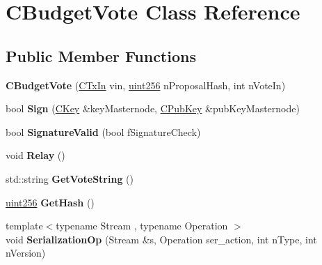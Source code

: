 \hypertarget{class_c_budget_vote}{}\section{C\+Budget\+Vote Class Reference}
\label{class_c_budget_vote}
\subsection*{Public Member Functions}
\begin{DoxyCompactItemize}
\item 
\mbox{\label{class_c_budget_vote_ae6c7bba44af43bbeb1a33f830e0b352e}} 
{\bfseries C\+Budget\+Vote} (\mbox{\hyperlink{class_c_tx_in}{C\+Tx\+In}} vin, \mbox{\hyperlink{classuint256}{uint256}} n\+Proposal\+Hash, int n\+Vote\+In)
\item 
\mbox{\label{class_c_budget_vote_a91e3490282974d9300ba080b4ea41e22}} 
bool {\bfseries Sign} (\mbox{\hyperlink{class_c_key}{C\+Key}} \&key\+Masternode, \mbox{\hyperlink{class_c_pub_key}{C\+Pub\+Key}} \&pub\+Key\+Masternode)
\item 
\mbox{\label{class_c_budget_vote_ab01d2ab30c3761318a7da919bff26697}} 
bool {\bfseries Signature\+Valid} (bool f\+Signature\+Check)
\item 
\mbox{\label{class_c_budget_vote_a2c761ac435fa5a5da6ccbeb308350a8f}} 
void {\bfseries Relay} ()
\item 
\mbox{\label{class_c_budget_vote_a97d8f521e59d47b70203515271ecd2fc}} 
std\+::string {\bfseries Get\+Vote\+String} ()
\item 
\mbox{\label{class_c_budget_vote_acb9bda3b41d3bd1ebf04ccdcb3d2d926}} 
\mbox{\hyperlink{classuint256}{uint256}} {\bfseries Get\+Hash} ()
\item 
\mbox{\label{class_c_budget_vote_a9899da97644defecdd4d64984cdbcd97}} 
{\footnotesize template$<$typename Stream , typename Operation $>$ }\\void {\bfseries Serialization\+Op} (Stream \&s, Operation ser\+\_\+action, int n\+Type, int n\+Version)
\end{DoxyCompactItemize}
